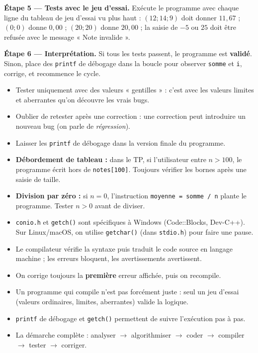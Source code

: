 \documentclass[11pt]{article}
\newcommand{\cle}[1]{{\popxbold\color{popdark}#1}}
\begin{document}
\begin{experience}
\textbf{Étape 5 — Tests avec le jeu d'essai.} Exécute le programme avec chaque ligne du tableau de jeu d'essai vu plus haut : $(12; 14; 9)$ doit donner $11{,}67$ ; $(0; 0)$ donne $0{,}00$ ; $(20; 20)$ donne $20{,}00$ ; la saisie de $-5$ ou $25$ doit être refusée avec le message « Note invalide ».

\textbf{Étape 6 — Interprétation.} Si tous les tests passent, le programme est \textbf{validé}. Sinon, place des \texttt{printf} de débogage dans la boucle pour observer \texttt{somme} et \texttt{i}, corrige, et recommence le cycle.
\end{experience}

\begin{attention}
\begin{itemize}
  \item Tester uniquement avec des valeurs « gentilles » : c'est avec les valeurs limites et aberrantes qu'on découvre les vrais bugs.
  \item Oublier de retester après une correction : une correction peut introduire un nouveau bug (on parle de \emph{régression}).
  \item Laisser les \texttt{printf} de débogage dans la version finale du programme.
  \item \textbf{Débordement de tableau :} dans le TP, si l'utilisateur entre $n > 100$, le programme écrit hors de \texttt{notes[100]}. Toujours vérifier les bornes après une saisie de taille.
  \item \textbf{Division par zéro :} si $n = 0$, l'instruction \texttt{moyenne = somme / n} plante le programme. Tester $n > 0$ avant de diviser.
  \item \texttt{conio.h} et \texttt{getch()} sont spécifiques à Windows (Code::Blocks, Dev-C++). Sur Linux/macOS, on utilise \texttt{getchar()} (dans \texttt{stdio.h}) pour faire une pause.
\end{itemize}
\end{attention}

\begin{aretenir}
\begin{itemize}
  \item Le \cle{compilateur} vérifie la syntaxe puis traduit le code source en langage machine ; les \cle{erreurs} bloquent, les \cle{avertissements} avertissent.
  \item On corrige toujours la \textbf{première} erreur affichée, puis on recompile.
  \item Un programme qui compile n'est pas forcément juste : seul un \cle{jeu d'essai} (valeurs ordinaires, limites, aberrantes) valide la logique.
  \item \texttt{printf} de débogage et \texttt{getch()} permettent de suivre l'exécution pas à pas.
  \item La démarche complète : analyser $\rightarrow$ algorithmiser $\rightarrow$ coder $\rightarrow$ compiler $\rightarrow$ tester $\rightarrow$ corriger.
\end{itemize}
\end{aretenir}
\end{document}
